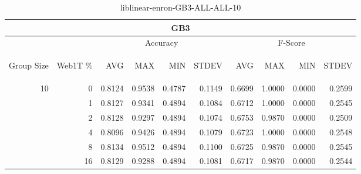 \begin{center}
\begin{table}[htbp]
\begin{tabular}{ | r | r | r | r | r | r | r | r | r | r |}
\hline
\multicolumn{10}{|c|}{GB3}\\
\hline
 & & \multicolumn{4}{|c|}{Accuracy} & \multicolumn{4}{|c|}{F-Score}\\ \cline{3-10}
\begin{sideways}Group Size\end{sideways} & \begin{sideways}Web1T \%\end{sideways} & \begin{sideways}AVG\end{sideways} & \begin{sideways}MAX\end{sideways} & \begin{sideways}MIN\end{sideways} & \begin{sideways}STDEV\end{sideways} & \begin{sideways}AVG\end{sideways} & \begin{sideways}MAX\end{sideways} & \begin{sideways}MIN\end{sideways} & \begin{sideways}STDEV\end{sideways}\\
\hline
\multirow{6}{*}{10}
 & 0 & 0.8124 & 0.9538 & 0.4787 & 0.1149 & 0.6699 & 1.0000 & 0.0000 & 0.2599\\ \cline{2-10}
 & 1 & 0.8127 & 0.9341 & 0.4894 & 0.1084 & 0.6712 & 1.0000 & 0.0000 & 0.2545\\ \cline{2-10}
 & 2 & 0.8128 & 0.9297 & 0.4894 & 0.1074 & 0.6753 & 0.9870 & 0.0000 & 0.2509\\ \cline{2-10}
 & 4 & 0.8096 & 0.9426 & 0.4894 & 0.1079 & 0.6723 & 1.0000 & 0.0000 & 0.2548\\ \cline{2-10}
 & 8 & 0.8134 & 0.9512 & 0.4894 & 0.1100 & 0.6725 & 0.9870 & 0.0000 & 0.2545\\ \cline{2-10}
 & 16 & 0.8129 & 0.9288 & 0.4894 & 0.1081 & 0.6717 & 0.9870 & 0.0000 & 0.2544\\ \cline{2-10}
\hline
\end{tabular}
\caption{liblinear-enron-GB3-ALL-ALL-10}
\end{table}
\end{center}

